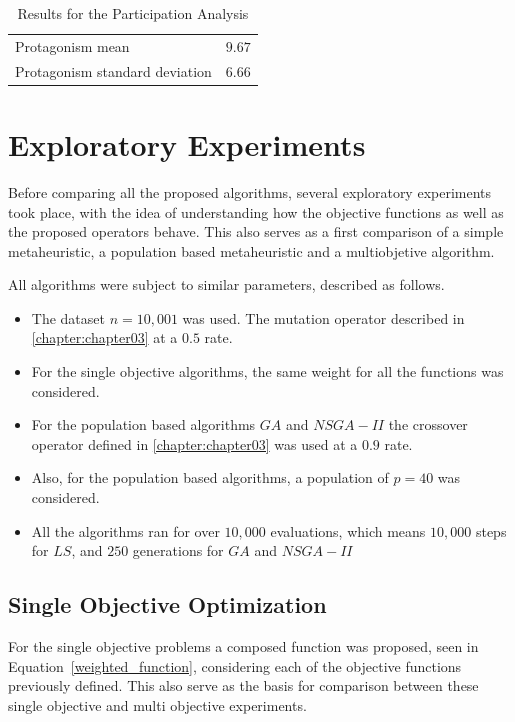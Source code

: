 \begin{table}[]
    \begin{tabular}{ll}
    Protagonism mean               & $9.67$ \\
    Protagonism standard deviation & $6.66$
    \end{tabular}
    \caption{Results for the Participation Analysis}
    \label{table:participation_results}
\end{table}

\section{Exploratory Experiments}

Before comparing all the proposed algorithms, several exploratory experiments took place, with the idea of understanding how the objective functions as well as the proposed operators behave. This also serves as a first comparison of a simple metaheuristic, a population based metaheuristic and a multiobjetive algorithm. 

All algorithms were subject to similar parameters, described as follows.

\begin{itemize}
    \item The dataset $n=10,001$ was used. The mutation operator described in \ref{chapter:chapter03} at a $0.5$ rate.

    \item For the single objective algorithms, the same weight for all the functions was considered.
    
    \item For the population based algorithms $GA$ and $NSGA-II$ the crossover operator defined in \ref{chapter:chapter03} was used at a $0.9$ rate.

    \item Also, for the population based algorithms, a population of $p=40$ was considered. 
    
    \item All the algorithms ran for over $10,000$ evaluations, which means $10,000$ steps for $LS$, and $250$ generations for $GA$ and $NSGA-II$
\end{itemize}

\subsection{Single Objective Optimization}

For the single objective problems a composed function was proposed, seen in Equation~\ref{weighted_function}, considering each of the objective functions previously defined. This also serve as the basis for comparison between these single objective and multi objective experiments.\\


